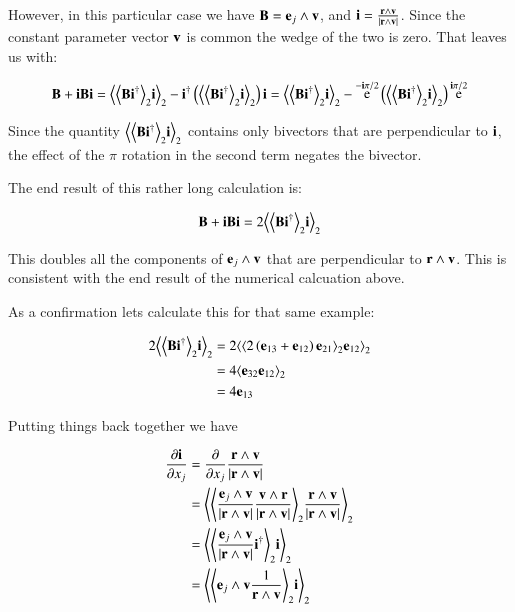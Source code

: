 \documentclass{article}      %
\newcommand{\dxj}[2] {\frac {\partial {#1}} {\partial {x_{#2}}}}
\DeclareMathOperator{\Exp}{e}
\newcommand{\gpgrade}[2] {{\left\langle{{#1}}\right\rangle}_{#2}}
\newcommand{\gpgradetwo}[1] {\gpgrade{#1}{2}}
\begin{document}
However, in this particular case we have $\mathbf{B} = \mathbf{e}_j \wedge \mathbf{v}$, and $\mathbf{i} = \frac{\mathbf{r} \wedge \mathbf{v}}{\lvert{\mathbf{r}\wedge \mathbf{v}}\rvert}$.  Since the constant parameter vector $\mathbf{v}$
is common the wedge of the two is zero.  That leaves us with:

\[
\BB + \Bi\BB\Bi
=
\gpgradetwo{\gpgradetwo{\BB \Bi^\dagger} \Bi} - \Bi^\dagger\left( \gpgradetwo{\gpgradetwo{\BB \Bi^\dagger} \Bi} \right)\Bi 
=
\gpgradetwo{\gpgradetwo{\BB \Bi^\dagger} \Bi} - \Exp^{-\Bi\pi/2}\left( \gpgradetwo{\gpgradetwo{\BB \Bi^\dagger} \Bi} \right)\Exp^{\Bi\pi/2}
\]

Since the quantity $\gpgradetwo{\gpgradetwo{\BB \Bi^\dagger} \Bi}$ contains only bivectors that are perpendicular to $\mathbf{i}$, the effect of the $\pi$ rotation in the 
second term negates the bivector.

The end result of this rather long calculation is:

\[
\BB + \Bi\BB\Bi = 2 \gpgradetwo{\gpgradetwo{\BB \Bi^\dagger} \Bi}
\]

This doubles all the components of $\mathbf{e}_j \wedge \mathbf{v}$ that are perpendicular to $\mathbf{r} \wedge \mathbf{v}$.  This is consistent with the end result of the numerical
calcuation above.

As a confirmation lets calculate this for that same example:

\begin{align*}
2\gpgradetwo{\gpgradetwo{\BB \Bi^\dagger} \Bi}
&= 2\gpgradetwo{\gpgradetwo{ 2\left(\Be_{13} + \Be_{12}\right) \Be_{21} } \Be_{12}} \\
&= 4\gpgradetwo{\Be_{32} \Be_{12}} \\
&= 4\Be_{13} \\
\end{align*}

Putting things back together we have

\begin{align*}
\dxj{\Bi}{j}
&= \dxj{}{j} \frac{\Br \wedge \Bv}{\abs{\Br \wedge \Bv}} \\
&= 
\gpgradetwo{
\gpgradetwo{ \frac{\Be_j \wedge \Bv}{\abs{\Br \wedge \Bv}} \frac{\Bv \wedge \Br}{\abs{\Br \wedge \Bv}} }
    \frac{\Br \wedge \Bv}{\abs{\Br \wedge \Bv}}
} \\
&= \gpgradetwo{ \gpgradetwo{ \frac{\Be_j \wedge \Bv}{\abs{\Br \wedge \Bv}} \Bi^\dagger } \Bi } \\
&= \gpgradetwo{ \gpgradetwo{ \Be_j \wedge \Bv \inv{\Br \wedge \Bv} } \Bi } \\
\end{align*}
\end{document}
